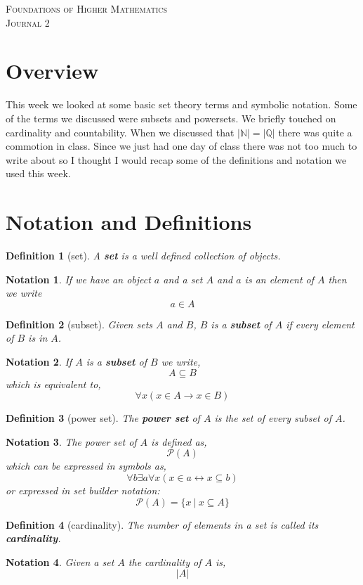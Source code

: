 \documentclass{article}
\theoremstyle{defintion}
\newtheorem*{defn}{Definition}
\newtheorem*{nota}{Notation}
\newcommand{\classname}{
Foundations of Higher Mathematics
}
\newcommand{\journal}{
2
}
\begin{document}

\begin{center}
\textsc{\Large \classname}\\[.3cm]
\textsc{\Large Journal \journal}\\[1cm]
\end{center}

\section*{Overview}
This week we looked at some basic set theory terms and symbolic notation. Some of the terms we discussed were subsets and powersets. We briefly touched on cardinality and countability. When we discussed that $|\mathbb{N}| = |\mathbb{Q}|$ there was quite a commotion in class. Since we just had one day of class there was not too much to write about so I thought I would recap some of the definitions and notation we used this week.

\section*{Notation and Definitions}
\begin{defn}[set]
A \textbf{set} is a well defined collection of objects.
\end{defn}

\begin{nota}
\indent If we have an object $a$ and a set $A$ and $a$ is an element of $A$ then we write $$a \in A$$
\end{nota}

\begin{defn}[subset]
Given sets $A$ and $B$, $B$ is a \textbf{subset} of $A$ if every element of $B$ is in $A$.
\end{defn}

\begin{nota}
If $A$ is a \textbf{subset} of $B$ we write, $$A \subseteq B$$ which is equivalent to, $$\forall x(x \in A \to x \in B)$$
\end{nota}

\begin{defn}[power set]
The \textbf{power set} of $A$ is the set of every subset of $A$.
\end{defn}

\begin{nota}
The power set of $A$ is defined as, $$\mathcal{P}{(A)}$$
which can be expressed in symbols as,
$$\forall b \exists a \forall x(x \in a \leftrightarrow x \subseteq b)$$
or expressed in set builder notation:
$$ \mathcal{P}{(A)} = \{ x\ |\ x \subseteq A \} $$
\end{nota}

\begin{defn}[cardinality]
The number of elements in a set is called its \textbf{cardinality}.
\end{defn}

\begin{nota}
Given a set $A$ the cardinality of $A$ is,
$$\left\vert{A}\right\vert $$
\end{nota}
\end{document}
